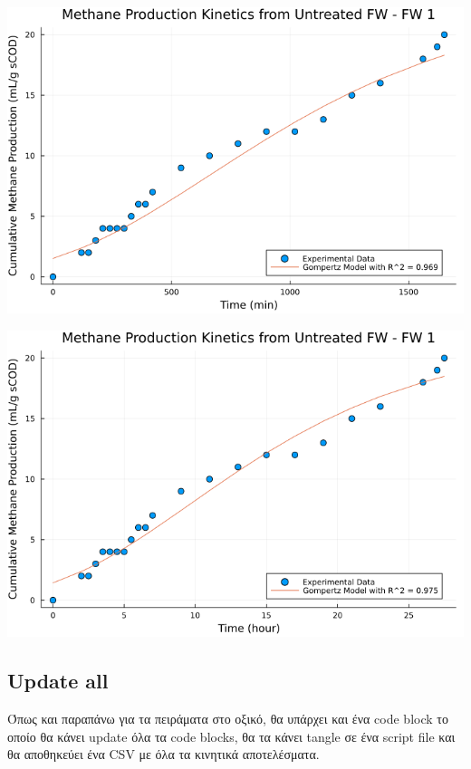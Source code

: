 \documentclass[11pt]{article}
\begin{document}
\begin{center}
\includegraphics[width=.9\linewidth]{../plots/BMPs/Untreated FW/methane_kinetics_untreated_fw_1_min.png}
\end{center}

\begin{center}
\includegraphics[width=.9\linewidth]{../plots/BMPs/Untreated FW/methane_kinetics_untreated_fw_1_hour.png}
\end{center}


\subsection{Update all}
\label{sec:org9c37242}
Όπως και παραπάνω για τα πειράματα στο οξικό, θα υπάρχει και ένα code block το οποίο θα κάνει update όλα τα code blocks, θα τα κάνει tangle σε ένα script file και θα αποθηκεύει ένα CSV με όλα τα κινητικά αποτελέσματα.
\end{document}
